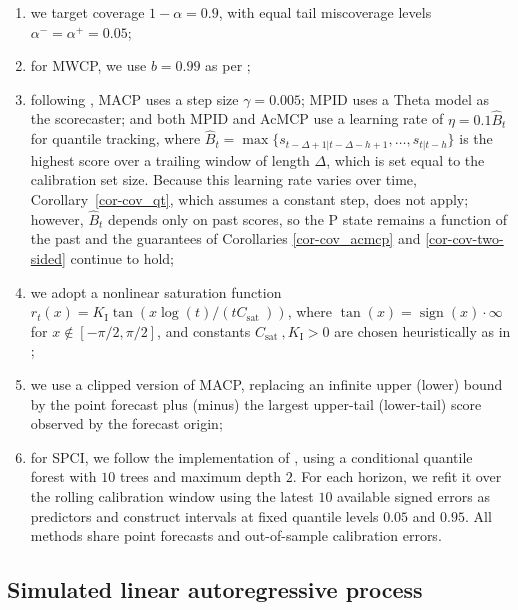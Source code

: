\documentclass[
  american,
  12pt]{article}
\providecommand{\tightlist}{%
  \setlength{\itemsep}{0pt}\setlength{\parskip}{0pt}}
\theoremstyle{plain}
\theoremstyle{plain}
\theoremstyle{remark}
\begin{document}
\begin{enumerate}
\def\labelenumi{(\alph{enumi})}
\tightlist
\item
  we target coverage \(1-\alpha=0.9\), with equal tail miscoverage
  levels \(\alpha^{-}=\alpha^{+}=0.05\);
\item
  for MWCP, we use \(b=0.99\) as per \citet{barber2023};
\item
  following \citet{angelopoulos2024}, MACP uses a step size
  \(\gamma=0.005\); MPID uses a Theta model as the scorecaster; and both
  MPID and AcMCP use a learning rate of \(\eta=0.1\hat{B}_t\) for
  quantile tracking, where
  \(\hat{B}_t=\max\{s_{t-\Delta+1|t-\Delta-h+1}, \dots, s_{t|t-h}\}\) is
  the highest score over a trailing window of length \(\Delta\), which
  is set equal to the calibration set size. Because this learning rate
  varies over time, Corollary~\ref{cor-cov_qt}, which assumes a constant
  step, does not apply; however, \(\hat{B}_t\) depends only on past
  scores, so the P state remains a function of the past and the
  guarantees of Corollaries \ref{cor-cov_acmcp} and
  \ref{cor-cov-two-sided} continue to hold;
\item
  we adopt a nonlinear saturation function
  \(r_t(x)=K_{\mathrm I} \tan \left(x \log (t) / (t C_{\text {sat }})\right)\),
  where \(\tan (x)=\operatorname{sign}(x) \cdot \infty\) for
  \(x \notin[-\pi / 2, \pi / 2]\), and constants
  \(C_{\text {sat }}, K_{\mathrm{I}}>0\) are chosen heuristically as in
  \citet{angelopoulos2024};
\item
  we use a clipped version of MACP, replacing an infinite upper (lower)
  bound by the point forecast plus (minus) the largest upper-tail
  (lower-tail) score observed by the forecast origin;
\item
  for SPCI, we follow the implementation of \citet{xu2023}, using a
  conditional quantile forest with \(10\) trees and maximum depth \(2\).
  For each horizon, we refit it over the rolling calibration window
  using the latest \(10\) available signed errors as predictors and
  construct intervals at fixed quantile levels \(0.05\) and \(0.95\).
  All methods share point forecasts and out-of-sample calibration
  errors.
\end{enumerate}

\subsection{Simulated linear autoregressive process}\label{sec-simar}
\end{document}
